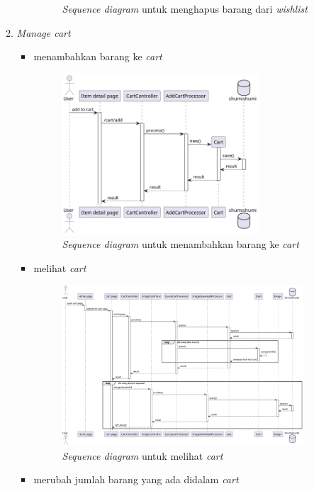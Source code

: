 \documentclass[a4paper]{article}
\begin{document}
\begin{enumerate}
\begin{enumerate}
\begin{itemize}
\begin{figure}[h]
                \caption{\textit{Sequence diagram} untuk menghapus barang dari \textit{wishlist}}
            \end{figure}
        \end{itemize}

        \newpage
        \item \textit{Manage cart}
        \begin{itemize}
            \item menambahkan barang ke \textit{cart}
            \begin{figure}[h]
                \centering
                \includegraphics*[height=6cm]{./diagram/sequence diagram/13. cart/add to cart/add to cart.png}
                \caption{\textit{Sequence diagram} untuk menambahkan barang ke \textit{cart}}
            \end{figure}
            \item melihat \textit{cart}
            \begin{figure}[h]
                \centering
                \includegraphics*[height=6cm]{./diagram/sequence diagram/13. cart/query cart list/query cart list.png}
                \caption{\textit{Sequence diagram} untuk melihat \textit{cart}}
            \end{figure}
            \newpage
            \item merubah jumlah barang yang ada didalam \textit{cart}

\end{itemize}
\end{enumerate}
\end{enumerate}
\end{document}
